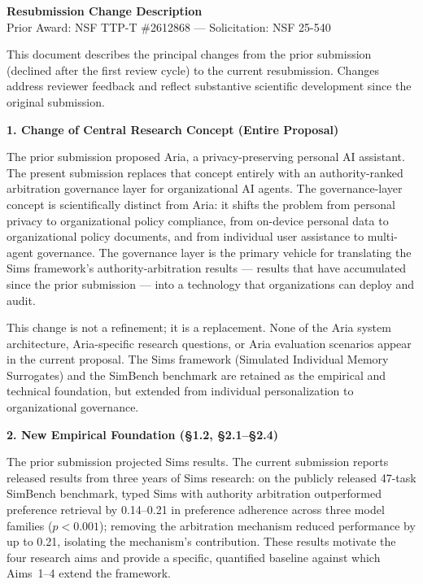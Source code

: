 \documentclass[11pt]{article}
\begin{document}
\begin{center}
  {\large\bfseries Resubmission Change Description}\\[4pt]
  {\normalsize Prior Award: NSF TTP-T \#2612868 --- Solicitation: NSF 25-540}
\end{center}

\noindent This document describes the principal changes from the prior submission (declined after the first review cycle) to the current resubmission. Changes address reviewer feedback and reflect substantive scientific development since the original submission.

\bigskip
\noindent\textbf{1. Change of Central Research Concept (Entire Proposal)}

The prior submission proposed Aria, a privacy-preserving personal AI assistant. The present submission replaces that concept entirely with an authority-ranked arbitration governance layer for organizational AI agents. The governance-layer concept is scientifically distinct from Aria: it shifts the problem from personal privacy to organizational policy compliance, from on-device personal data to organizational policy documents, and from individual user assistance to multi-agent governance. The governance layer is the primary vehicle for translating the Sims framework's authority-arbitration results --- results that have accumulated since the prior submission --- into a technology that organizations can deploy and audit.

This change is not a refinement; it is a replacement. None of the Aria system architecture, Aria-specific research questions, or Aria evaluation scenarios appear in the current proposal. The Sims framework (Simulated Individual Memory Surrogates) and the SimBench benchmark are retained as the empirical and technical foundation, but extended from individual personalization to organizational governance.

\bigskip
\noindent\textbf{2. New Empirical Foundation (§1.2, §2.1--§2.4)}

The prior submission projected Sims results. The current submission reports released results from three years of Sims research: on the publicly released 47-task SimBench benchmark, typed Sims with authority arbitration outperformed preference retrieval by 0.14--0.21 in preference adherence across three model families ($p < 0.001$); removing the arbitration mechanism reduced performance by up to 0.21, isolating the mechanism's contribution. These results motivate the four research aims and provide a specific, quantified baseline against which Aims~1--4 extend the framework.
\end{document}
